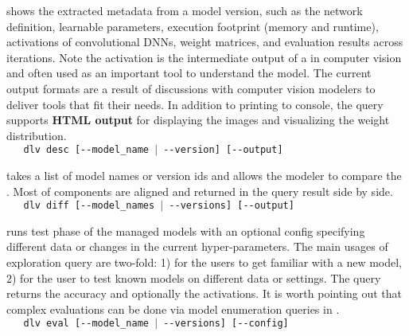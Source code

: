 \documentclass[conference]{IEEEtran}
\begin{document}
 shows the extracted metadata from a model version,
    such as the network definition, learnable parameters, execution footprint (memory and runtime),
    activations of convolutional DNNs, weight matrices, and evaluation results across iterations.
    Note the activation is the intermediate output of a \dnn\model in computer vision and often
    used as an important tool to understand the model. The current output formats are a result of
    discussions with computer vision modelers to deliver tools that fit their needs. In
    addition to printing to console, the query supports {\bf HTML output} for displaying the images and visualizing the weight distribution.%
\\{\small{\verb|   dlv desc [--model_name |\texttt{$\vert$}\verb| --version] [--output]|}}


 takes a list of model names or version ids and allows the
modeler to compare the \dnn\models. Most of  components are aligned and returned in the
query result side by side. %
\\{\small{\verb|   dlv diff [--model_names |\texttt{$\vert$}\verb| --versions] [--output]|}}


 runs test phase of the managed models with an optional config
specifying different data or changes in the current hyper-parameters. The main usages of exploration
query are two-fold: 1) for the users to get familiar with a new model, 2) for the user
to test known models on different data or settings. The query returns the accuracy and optionally the activations. 
It is worth pointing out  that complex evaluations can be done via model enumeration queries in \DQL.%
\\{\small{\verb|   dlv eval [--model_name |\texttt{$\vert$}\verb| --versions] [--config]|}}
\end{document}
